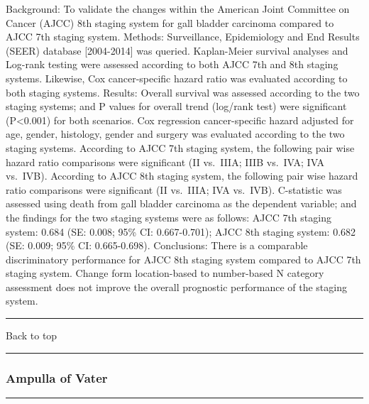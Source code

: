 \documentclass[]{article}
\begin{document}
Background: To validate the changes within the American Joint Committee
on Cancer (AJCC) 8th staging system for gall bladder carcinoma compared
to AJCC 7th staging system. Methods: Surveillance, Epidemiology and End
Results (SEER) database {[}2004-2014{]} was queried. Kaplan-Meier
survival analyses and Log-rank testing were assessed according to both
AJCC 7th and 8th staging systems. Likewise, Cox cancer-specific hazard
ratio was evaluated according to both staging systems. Results: Overall
survival was assessed according to the two staging systems; and P values
for overall trend (log/rank test) were significant (P\textless{}0.001)
for both scenarios. Cox regression cancer-specific hazard adjusted for
age, gender, histology, gender and surgery was evaluated according to
the two staging systems. According to AJCC 7th staging system, the
following pair wise hazard ratio comparisons were significant (II
vs.~IIIA; IIIB vs.~IVA; IVA vs.~IVB). According to AJCC 8th staging
system, the following pair wise hazard ratio comparisons were
significant (II vs.~IIIA; IVA vs.~IVB). C-statistic was assessed using
death from gall bladder carcinoma as the dependent variable; and the
findings for the two staging systems were as follows: AJCC 7th staging
system: 0.684 (SE: 0.008; 95\% CI: 0.667-0.701); AJCC 8th staging
system: 0.682 (SE: 0.009; 95\% CI: 0.665-0.698). Conclusions: There is a
comparable discriminatory performance for AJCC 8th staging system
compared to AJCC 7th staging system. Change form location-based to
number-based N category assessment does not improve the overall
prognostic performance of the staging system.

{}

{}

\begin{center}\rule{0.5\linewidth}{\linethickness}\end{center}

Back to top

\begin{center}\rule{0.5\linewidth}{\linethickness}\end{center}

\pagebreak

\hypertarget{ampulla-of-vater}{%
\subsubsection{Ampulla of Vater}\label{ampulla-of-vater}}

\begin{center}\rule{0.5\linewidth}{\linethickness}\end{center}
\end{document}
